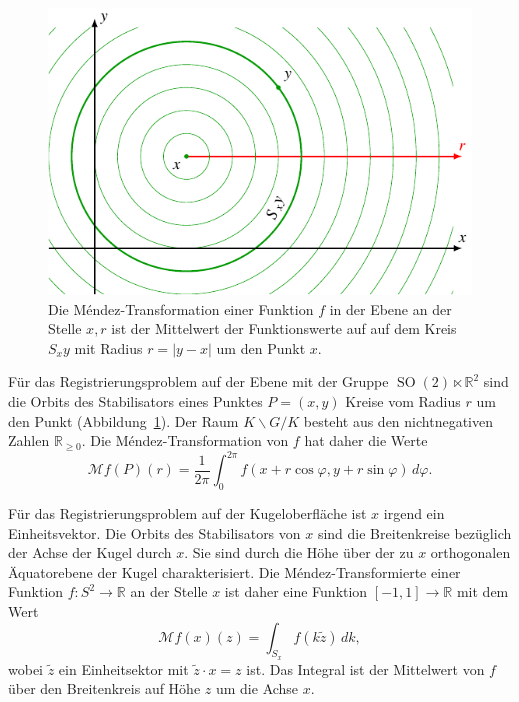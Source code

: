 \begin{beispiel}
\begin{figure}
\centering
\includegraphics{chapters/070-nichtkomm/images/2dmendez.pdf}
\caption{Die Méndez-Transformation einer Funktion $f$ in der
Ebene an der Stelle $x,r$ ist der Mittelwert der Funktionswerte
auf auf dem Kreis $S_xy$ mit Radius $r=|y-x|$ um den Punkt $x$.
\label{buch:nichtkomm:mendez:fig:2d}}
\end{figure}
Für das Registrierungsproblem auf der Ebene mit der Gruppe
$\operatorname{SO}(2)\ltimes \mathbb{R}^2$ sind die Orbits des
Stabilisators eines Punktes $P=(x,y)$ Kreise vom Radius $r$ um
den Punkt (Abbildung~\ref{buch:nichtkomm:mendez:fig:2d}).
Der Raum $K\backslash G/K$ besteht aus den nichtnegativen
Zahlen $\mathbb{R}_{\ge 0}$.
Die Méndez-Transformation von $f$ hat daher die Werte
\[
\mathcal{M}f(P)(r)
=
\frac{1}{2\pi}
\int_0^{2\pi}
f(x+r\cos\varphi,y+r\sin\varphi)\,d\varphi.
\]
\end{beispiel}

\begin{beispiel}
Für das Registrierungsproblem auf der Kugeloberfläche ist $x$ irgend ein
Einheitsvektor.
Die Orbits des Stabilisators von $x$ sind die Breitenkreise bezüglich
der Achse der Kugel durch $x$.
Sie sind durch die Höhe über der zu $x$ orthogonalen Äquatorebene der
Kugel charakterisiert.
Die Méndez-Transformierte einer Funktion $f\colon S^2\to \mathbb{R}$
an der Stelle $x$ ist daher eine Funktion $[-1,1]\to\mathbb{R}$ mit
dem Wert
\[
\mathcal{M}f (x)(z)
=
\int_{S_x} f(k\tilde{z})\,dk,
\]
wobei $\tilde{z}$ ein Einheitsektor mit $\tilde{z}\cdot x=z$ ist.
Das Integral ist der Mittelwert von $f$ über den Breitenkreis
auf Höhe $z$ um die Achse $x$.
\end{beispiel}

